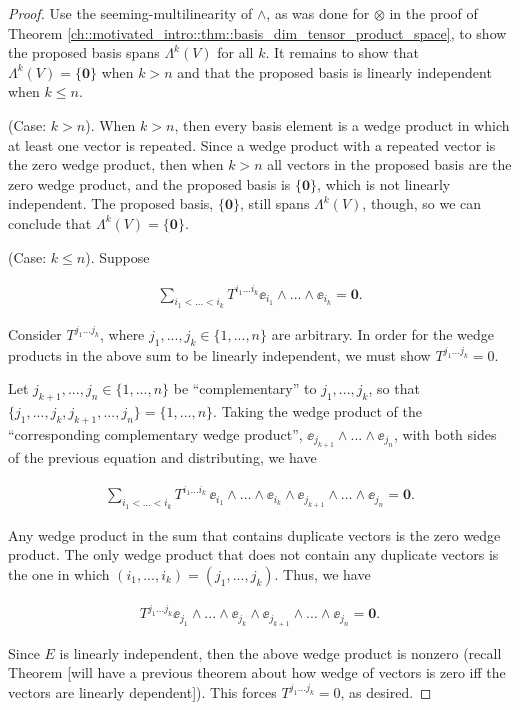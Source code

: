 \begin{proof}
    Use the seeming-multilinearity of $\wedge$, as was done for $\otimes$ in the proof of Theorem \ref{ch::motivated_intro::thm::basis_dim_tensor_product_space}, to show the proposed basis spans $\Lambda^k(V)$ for all $k$. It remains to show that $\Lambda^k(V) = \{\mathbf{0}\}$ when $k > n$ and that the proposed basis is linearly independent when $k \leq n$.

    (Case: $k > n$). When $k > n$, then every basis element is a wedge product in which at least one vector is repeated. Since a wedge product with a repeated vector is the zero wedge product, then when $k > n$ all vectors in the proposed basis are the zero wedge product, and the proposed basis is $\{\mathbf{0}\}$, which is not linearly independent. The proposed basis, $\{\mathbf{0}\}$, still spans $\Lambda^k(V)$, though, so we can conclude that $\Lambda^k(V) = \{\mathbf{0}\}$.

    (Case: $k \leq n$). Suppose 

    \begin{align*}
        \sum_{i_1 < ... < i_k} T^{i_1 ... i_k} \ee_{i_1} \wedge ... \wedge \ee_{i_k} = \mathbf{0}.
    \end{align*}

    Consider $T^{j_1 ... j_k}$, where $j_1, ..., j_k \in \{1, ..., n\}$ are arbitrary. In order for the wedge products in the above sum to be linearly independent, we must show $T^{j_1 ... j_k} = 0$.

    Let $j_{k + 1}, ..., j_n \in \{1, ..., n\}$ be ``complementary'' to $j_1, ..., j_k$, so that $\{j_1, ..., j_k, j_{k + 1}, ..., j_n\} = \{1, ..., n\}$. Taking the wedge product of the ``corresponding complementary wedge product'', $\ee_{j_{k + 1}} \wedge ... \wedge \ee_{j_n}$, with both sides of the previous equation and distributing, we have

    \begin{align*}
        \sum_{i_1 < \ldots < i_k} T^{i_1 \ldots i_k} \, \ee_{i_1} \wedge \ldots \wedge \ee_{i_k} \wedge \ee_{j_{k + 1}} \wedge \ldots \wedge \ee_{j_n} = \mathbf{0}.
    \end{align*}

    Any wedge product in the sum that contains duplicate vectors is the zero wedge product. The only wedge product that does not contain any duplicate vectors is the one in which $(i_1, ..., i_k) = (j_1, ..., j_k)$. Thus, we have

    \begin{align*}
        T^{j_1 ... j_k} \ee_{j_1} \wedge ... \wedge \ee_{j_k} \wedge \ee_{j_{k + 1}} \wedge ... \wedge \ee_{j_n} = \mathbf{0}.
    \end{align*}

    Since $E$ is linearly independent, then the above wedge product is nonzero (recall Theorem [will have a previous theorem about how wedge of vectors is zero iff the vectors are linearly dependent]). This forces $T^{j_1 ... j_k} = 0$, as desired. 
\end{proof}

